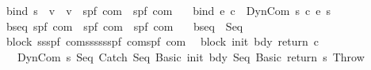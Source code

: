 \begin{isabellebody}
\isanewline
{}\isamarkupfalse%
\isanewline
\ \ bind{\isacharcolon}{\isacharcolon}\ {\isachardoublequoteopen}{\isacharparenleft}{\isacharprime}s\ {\isasymRightarrow}\ {\isacharprime}v{\isacharparenright}\ {\isasymRightarrow}\ {\isacharparenleft}{\isacharprime}v\ {\isasymRightarrow}\ {\isacharparenleft}{\isacharprime}s{\isacharcomma}{\isacharprime}p{\isacharcomma}{\isacharprime}f{\isacharparenright}\ com{\isacharparenright}\ {\isasymRightarrow}\ {\isacharparenleft}{\isacharprime}s{\isacharcomma}{\isacharprime}p{\isacharcomma}{\isacharprime}f{\isacharparenright}\ com{\isachardoublequoteclose}\ \isanewline
\ \ {\isachardoublequoteopen}bind\ e\ c\ {\isacharequal}\ DynCom\ {\isacharparenleft}{\isasymlambda}s{\isachardot}\ c\ {\isacharparenleft}e\ s{\isacharparenright}{\isacharparenright}{\isachardoublequoteclose}\isanewline
\isanewline
{}\isamarkupfalse%
\isanewline
\ \ bseq{\isacharcolon}{\isacharcolon}\ {\isachardoublequoteopen}{\isacharparenleft}{\isacharprime}s{\isacharcomma}{\isacharprime}p{\isacharcomma}{\isacharprime}f{\isacharparenright}\ com\ {\isasymRightarrow}\ {\isacharparenleft}{\isacharprime}s{\isacharcomma}{\isacharprime}p{\isacharcomma}{\isacharprime}f{\isacharparenright}\ com\ {\isasymRightarrow}\ {\isacharparenleft}{\isacharprime}s{\isacharcomma}{\isacharprime}p{\isacharcomma}{\isacharprime}f{\isacharparenright}\ com{\isachardoublequoteclose}\ \isanewline
\ \ {\isachardoublequoteopen}bseq\ {\isacharequal}\ Seq{\isachardoublequoteclose}\isanewline
\ \isanewline
{}\isamarkupfalse%
\isanewline
\ \ block{\isacharcolon}{\isacharcolon}\ {\isachardoublequoteopen}{\isacharbrackleft}{\isacharprime}s{\isasymRightarrow}{\isacharprime}s{\isacharcomma}{\isacharparenleft}{\isacharprime}s{\isacharcomma}{\isacharprime}p{\isacharcomma}{\isacharprime}f{\isacharparenright}\ com{\isacharcomma}{\isacharprime}s{\isasymRightarrow}{\isacharprime}s{\isasymRightarrow}{\isacharprime}s{\isacharcomma}{\isacharprime}s{\isasymRightarrow}{\isacharprime}s{\isasymRightarrow}{\isacharparenleft}{\isacharprime}s{\isacharcomma}{\isacharprime}p{\isacharcomma}{\isacharprime}f{\isacharparenright}\ com{\isacharbrackright}{\isasymRightarrow}{\isacharparenleft}{\isacharprime}s{\isacharcomma}{\isacharprime}p{\isacharcomma}{\isacharprime}f{\isacharparenright}\ com{\isachardoublequoteclose}\isanewline
{}\isanewline
\ \ {\isachardoublequoteopen}block\ init\ bdy\ return\ c\ {\isacharequal}\isanewline
\ \ \ \ DynCom\ {\isacharparenleft}{\isasymlambda}s{\isachardot}\ {\isacharparenleft}Seq\ {\isacharparenleft}Catch\ {\isacharparenleft}Seq\ {\isacharparenleft}Basic\ init{\isacharparenright}\ bdy{\isacharparenright}\ {\isacharparenleft}Seq\ {\isacharparenleft}Basic\ {\isacharparenleft}return\ s{\isacharparenright}{\isacharparenright}\ Throw{\isacharparenright}{\isacharparenright}\ \isanewline

\end{isabellebody}
